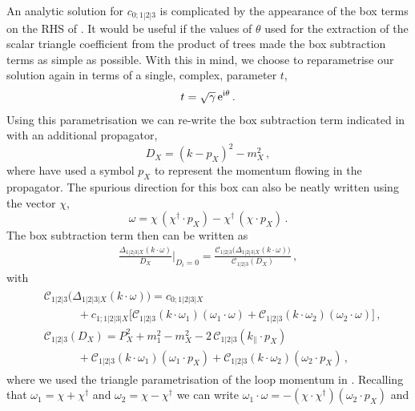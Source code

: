 An analytic solution for $c_{0;1|2|3}$ is complicated by the appearance of the
box terms on the RHS of . It would be
useful if the values of $\theta$ used for the extraction of the scalar triangle
coefficient from the product of trees made the box subtraction terms as simple
as possible. With this in mind, we choose to reparametrise our solution again in terms of a single, complex, parameter $t$,
\begin{align}
  t = \sqrt{\gamma} \, \mathrm{e}^{\mathrm{i} \theta} \,.
\end{align}
Using this parametrisation we can re-write the box subtraction term indicated in  with an additional propagator,
\begin{equation}
  D_X = (k-p_X)^2 - m_X^2 \,,
  \label{eq:boxsubprop}
\end{equation}
where have used a symbol $p_X$ to represent the momentum flowing in the propagator. The spurious direction for this box can also be neatly written using the vector $\chi$,
\begin{equation}
  \omega = \chi \, (\chi^\dagger\cdot p_X) - \chi^\dagger \, (\chi\cdot p_X) \,.
\end{equation}
The box subtraction term then can be written as
\begin{align}
\frac{\Delta_{1|2|3|X}(k\cdot\omega)}{D_X} \bigg|_{D_i=0} = \frac{\mathcal{C}_{1|2|3}\bigl(\Delta_{1|2|3|X}(k\cdot\omega)\bigr) }{ \mathcal{C}_{1|2|3}(D_X) } \,,
\end{align}
with
\begin{align}
\begin{aligned}
  & \mathcal{C}_{1|2|3}\bigl(\Delta_{1|2|3|X}(k\cdot\omega)\bigr) =
  c_{0;1|2|3|X} \\
  & \qquad \quad + c_{1;1|2|3|X}\bigl[ \mathcal{C}_{1|2|3}(k\cdot\omega_1) (\omega_1\cdot\omega) + \mathcal{C}_{1|2|3}(k\cdot\omega_2) (\omega_2\cdot\omega) \bigr] \,,\\
 & \mathcal{C}_{1|2|3}(D_X) =
  P_X^2 + m_1^2 - m_X^2
  - 2 \, \mathcal{C}_{1|2|3}(k_{\parallel}\cdot p_X) \\
  & \qquad \quad + \mathcal{C}_{1|2|3}(k\cdot\omega_1) (\omega_1\cdot p_X)
  + \mathcal{C}_{1|2|3}(k\cdot\omega_2) (\omega_2\cdot p_X) \,,
\end{aligned}
\end{align}
where we used the triangle parametrisation of the loop momentum in .
Recalling that $\omega_1 = \chi+\chi^{\dagger}$ and  $\omega_2 = \chi-\chi^{\dagger}$ we can write
$\omega_1\cdot\omega = - (\chi\cdot\chi^\dagger) (\omega_2\cdot p_X)$ and
